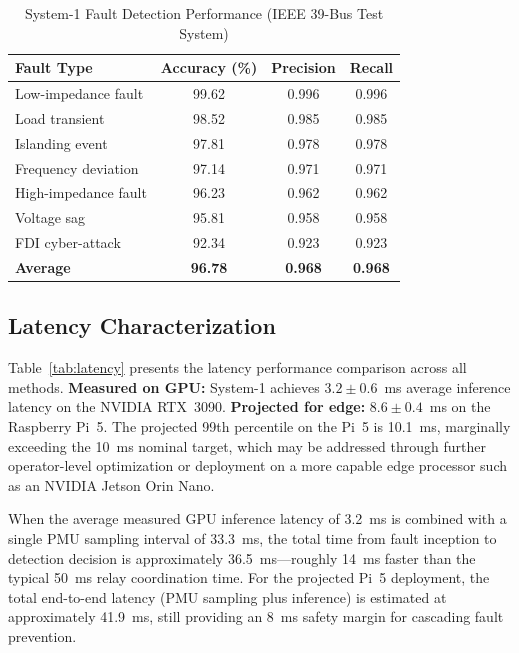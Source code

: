 \documentclass[journal]{IEEEtran}
\begin{document}
\begin{table}[!t]
\centering
\caption{System-1 Fault Detection Performance (IEEE 39-Bus Test System)}
\label{tab:accuracy}
\begin{tabular}{lccc}
\toprule
\textbf{Fault Type} & \textbf{Accuracy (\%)} & \textbf{Precision} & \textbf{Recall} \\
\midrule
Low-impedance fault & 99.62 & 0.996 & 0.996 \\
Load transient       & 98.52 & 0.985 & 0.985 \\
Islanding event      & 97.81 & 0.978 & 0.978 \\
Frequency deviation  & 97.14 & 0.971 & 0.971 \\
High-impedance fault & 96.23 & 0.962 & 0.962 \\
Voltage sag          & 95.81 & 0.958 & 0.958 \\
FDI cyber-attack     & 92.34 & 0.923 & 0.923 \\
\midrule
\textbf{Average}     & \textbf{96.78} & \textbf{0.968} & \textbf{0.968} \\
\bottomrule
\end{tabular}
\end{table}

\subsection{Latency Characterization}

Table~\ref{tab:latency} presents the latency performance comparison across all methods. \textbf{Measured on GPU:} System-1 achieves $3.2 \pm 0.6$~ms average inference latency on the NVIDIA RTX~3090. \textbf{Projected for edge:} $8.6 \pm 0.4$~ms on the Raspberry Pi~5. The projected 99th percentile on the Pi~5 is 10.1~ms, marginally exceeding the 10~ms nominal target, which may be addressed through further operator-level optimization or deployment on a more capable edge processor such as an NVIDIA Jetson Orin Nano.

When the average measured GPU inference latency of 3.2~ms is combined with a single PMU sampling interval of 33.3~ms, the total time from fault inception to detection decision is approximately 36.5~ms---roughly 14~ms faster than the typical 50~ms relay coordination time. For the projected Pi~5 deployment, the total end-to-end latency (PMU sampling plus inference) is estimated at approximately 41.9~ms, still providing an 8~ms safety margin for cascading fault prevention.
\end{document}
